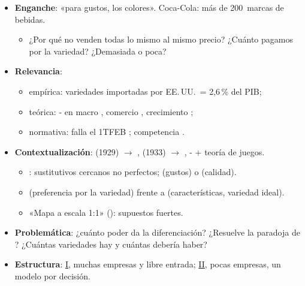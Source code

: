 \documentclass{article}
\begin{document}
\cabecerarepaso
\begin{columnas}

\begin{itemize}
\item \textbf{Enganche}: «para gustos, los colores». Coca-Cola: más de 200~marcas de bebidas.
  \begin{itemize}
  \item ¿Por qué no venden todas lo mismo al mismo precio? ¿Cuánto pagamos por la variedad? ¿Demasiada o poca?
  \end{itemize}
\item \textbf{Relevancia}:
  \begin{itemize}
  \item empírica: variedades importadas por EE.\,UU.\ = 2,6\,\% del PIB;
  \item teórica: - en macro , comercio , crecimiento ;
  \item normativa: falla el 1TFEB ; competencia .
  \end{itemize}
\item \textbf{Contextualización}:  (1929) $\to$ ,  (1933) $\to$ , - + teoría de juegos.
  \begin{itemize}
  \item {}: sustitutivos cercanos no perfectos;  (gustos) o  (calidad).
  \item {} (preferencia por la variedad) frente a  (características, variedad ideal).
  \item «Mapa a escala 1:1» (): supuestos fuertes.
  \end{itemize}
\item \textbf{Problemática}: ¿cuánto poder da la diferenciación? ¿Resuelve la paradoja de ? ¿Cuántas variedades hay y cuántas debería haber?
\item \textbf{Estructura}: \hyperref[rep:I]{I}, muchas empresas y libre entrada; \hyperref[rep:II]{II}, pocas empresas, un modelo por decisión.
\end{itemize}


\end{columnas}
\end{document}
